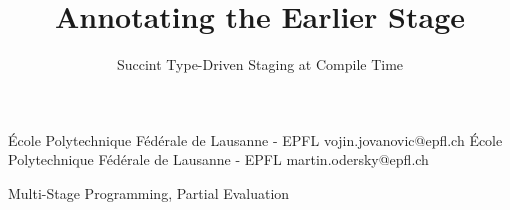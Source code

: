 \documentclass[10pt,preprint]{sigplanconf}
\begin{document}
\title{Annotating the Earlier Stage}
\subtitle{Succint Type-Driven Staging at Compile Time}

           {École Polytechnique Fédérale de Lausanne - EPFL}
           {vojin.jovanovic@epfl.ch}
           {École Polytechnique Fédérale de Lausanne - EPFL}
           {martin.odersky@epfl.ch}

\maketitle

\begin{abstract}

\end{abstract}

\keywords
Multi-Stage Programming, Partial Evaluation













\end{document}
